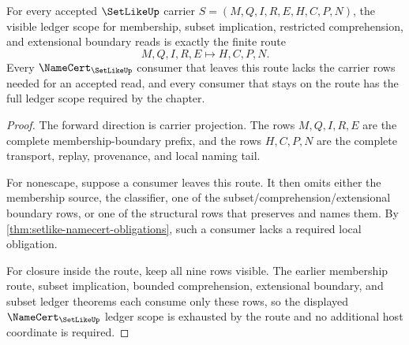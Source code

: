 \begin{theorem}
\label{thm:setlike-ledger-scope-closure}
For every accepted $\SetLikeUp$ carrier $S=(M,Q,I,R,E,H,C,P,N)$, the visible ledger scope for membership, subset implication, restricted comprehension, and extensional boundary reads is exactly the finite route
$$
M,Q,I,R,E \longmapsto H,C,P,N .
$$
Every $\NameCert_{\SetLikeUp}$ consumer that leaves this route lacks the carrier rows needed for an accepted read, and every consumer that stays on the route has the full ledger scope required by the chapter.
\end{theorem}
\begin{proof}
The forward direction is carrier projection. The rows $M,Q,I,R,E$ are the complete membership-boundary prefix, and the rows $H,C,P,N$ are the complete transport, replay, provenance, and local naming tail.

For nonescape, suppose a consumer leaves this route. It then omits either the membership source, the classifier, one of the subset/comprehension/extensional boundary rows, or one of the structural rows that preserves and names them. By \autoref{thm:setlike-namecert-obligations}, such a consumer lacks a required local obligation.

For closure inside the route, keep all nine rows visible. The earlier membership route, subset implication, bounded comprehension, extensional boundary, and subset ledger theorems each consume only these rows, so the displayed $\NameCert_{\SetLikeUp}$ ledger scope is exhausted by the route and no additional host coordinate is required.
\end{proof}



